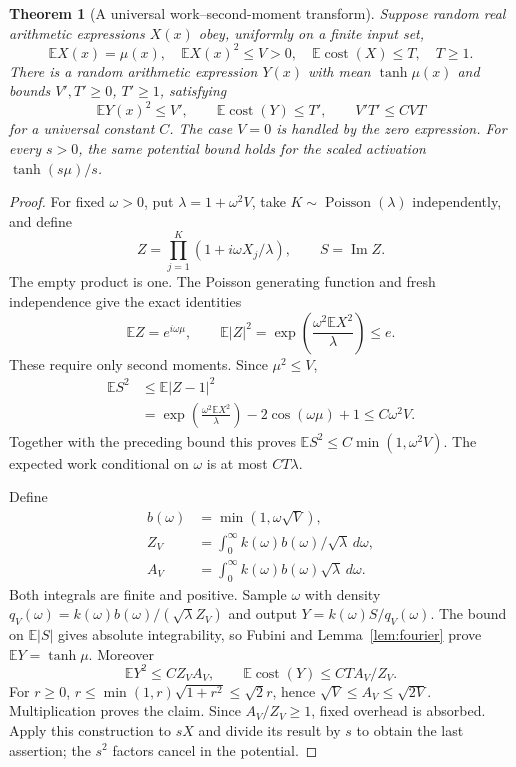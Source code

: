 \documentclass[11pt]{article}
\newtheorem{theorem}{Theorem}[section]
\theoremstyle{remark}\newtheorem{remark}[theorem]{Remark}
\newcommand{\E}{\mathbb E}
\newcommand{\Ima}{\operatorname{Im}}
\begin{document}
\begin{theorem}[A universal work--second-moment transform]
\label{thm:transform}
Suppose random real arithmetic expressions $X(x)$ obey, uniformly on a
finite input set,
\[
 \E X(x)=\mu(x),\quad \E X(x)^2\le V>0,
 \quad \E\operatorname{cost}(X)\le T,\quad T\ge1.
\]
There is a random arithmetic expression $Y(x)$ with mean
$\tanh\mu(x)$ and bounds $V',T'\ge0$, $T'\ge1$, satisfying
\[
 \E Y(x)^2\le V',\qquad
 \E\operatorname{cost}(Y)\le T',\qquad V'T'\le C VT
\]
for a universal constant $C$. The case $V=0$ is handled by the zero
expression. For every $s>0$, the same potential bound holds for the
scaled activation $\tanh(s\mu)/s$.
\end{theorem}
\begin{proof}
For fixed $\omega>0$, put $\lambda=1+\omega^2 V$, take
$K\sim\operatorname{Poisson}(\lambda)$ independently, and define
\[
 Z=\prod_{j=1}^K(1+i\omega X_j/\lambda),\qquad S=\Ima Z.
\]
The empty product is one. The Poisson generating function and fresh
independence give the exact identities
\[
 \E Z=e^{i\omega\mu},\qquad
 \E|Z|^2=\exp\!\left(\frac{\omega^2\E X^2}{\lambda}\right)\le e.
\]
These require only second moments. Since $\mu^2\le V$,
\begin{align*}
 \E S^2&\le\E|Z-1|^2\\
 &=\exp\!\left(\frac{\omega^2\E X^2}{\lambda}\right)
       -2\cos(\omega\mu)+1
 \le C\omega^2 V.
\end{align*}
Together with the preceding bound this proves
$\E S^2\le C\min(1,\omega^2 V)$. The expected work conditional on
$\omega$ is at most $CT\lambda$.

Define
\begin{align*}
 b(\omega)&=\min(1,\omega\sqrt V),\\
 Z_V&=\int_0^\infty k(\omega)b(\omega)/\sqrt\lambda\,d\omega,\\
 A_V&=\int_0^\infty k(\omega)b(\omega)\sqrt\lambda\,d\omega.
\end{align*}
Both integrals are finite and positive. Sample $\omega$ with density
$q_V(\omega)=k(\omega)b(\omega)/(\sqrt\lambda Z_V)$ and output
$Y=k(\omega)S/q_V(\omega)$. The bound on $\E|S|$ gives
absolute integrability, so Fubini and Lemma~\ref{lem:fourier} prove
$\E Y=\tanh\mu$. Moreover
\[
 \E Y^2\le C Z_VA_V,
 \qquad \E\operatorname{cost}(Y)\le CT A_V/Z_V.
\]
For $r\ge0$,
$r\le\min(1,r)\sqrt{1+r^2}\le\sqrt2r$, hence
$\sqrt V\le A_V\le\sqrt{2V}$. Multiplication proves the claim.
Since $A_V/Z_V\ge1$, fixed overhead is absorbed. Apply this
construction to $sX$ and divide its result by $s$ to obtain the last
assertion; the $s^2$ factors cancel in the potential.
\end{proof}
\end{document}
